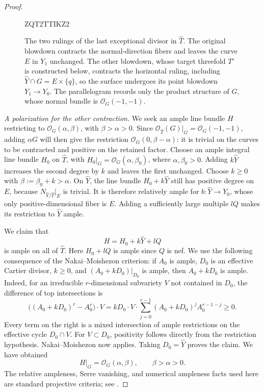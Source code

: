 \documentclass[11pt,reqno]{amsart}
\numberwithin{equation}{section}
\theoremstyle{definition}
\theoremstyle{remark}
\begin{document}
\begin{proof}
\begin{figure}[htbp]

\begingroup
{}
ZQT2TTIKZ2
\endgroup
\caption{The two rulings of the last exceptional divisor in
  $\widehat T$. The original blowdown contracts the normal-direction
  fibers and leaves the curve $E$ in $Y_1$ unchanged. The other
  blowdown, whose target threefold $T'$ is constructed below,
  contracts the horizontal ruling, including
  $\widehat Y\cap G=E\times\{q\}$, so the surface undergoes its
  point blowdown $Y_1\to Y_0$. The parallelogram records only the
  product structure of $G$, whose normal bundle is
  $\mathcal O_G(-1,-1)$.}
\label{fig:blowdown}
\end{figure}


 
 \emph{A polarization for the other contraction.}
We seek an ample line bundle $H$ restricting to
$\mathcal O_G(\alpha,\beta)$, with $\beta>\alpha>0$.
Since $\mathcal O_{\widehat T}(G)|_G=\mathcal O_G(-1,-1)$,
adding $\alpha G$ will then give the restriction
$\mathcal O_G(0,\beta-\alpha)$: it is trivial on the curves to be
contracted and positive on the retained factor.
Choose an ample integral line bundle $H_0$ on $\widehat T$, with
$H_0|_G=\mathcal O_G(\alpha,\beta_0)$, where $\alpha,\beta_0>0$.
Adding $k\widehat Y$ increases the second degree by $k$ and leaves the
first unchanged.  Choose $k\ge0$ with $\beta:=\beta_0+k>\alpha$.
On $\widehat Y$, the line bundle $H_0+k\widehat Y$ still has positive
degree on $E$, because $N_{\widehat Y/\widehat T}|_E$ is trivial.
It is therefore relatively ample for $b:\widehat Y\to Y_0$, whose
only positive-dimensional fiber is $E$.  Adding a sufficiently large
multiple $lQ$ makes its restriction to $\widehat Y$ ample.

We claim that
\[
 H=H_0+k\widehat Y+lQ
\]
is ample on all of $\widehat T$.  Here $H_0+lQ$ is ample since $Q$
is nef.  We use the following consequence of the Nakai--Moishezon
criterion: if $A_0$ is ample, $D_0$ is an effective Cartier divisor,
$k\ge0$, and $(A_0+kD_0)|_{D_0}$ is ample, then $A_0+kD_0$ is ample.
Indeed, for an irreducible $r$-dimensional subvariety $V$ not contained
in $D_0$, the difference of top intersections is
\[
 \bigl((A_0+kD_0)^r-A_0^r\bigr)\cdot V
 = kD_0\cdot V\cdot
   \sum_{j=0}^{r-1}(A_0+kD_0)^j A_0^{r-1-j}\ge0.
\]
Every term on the right is a mixed intersection of ample restrictions
on the effective cycle $D_0\cap V$.  For $V\subset D_0$, positivity
follows directly from the restriction hypothesis.  Nakai--Moishezon
now applies.  Taking $D_0=\widehat Y$ proves the claim.  We have obtained
\begin{equation}\label{proj:ample-degrees}
 H|_G=\mathcal O_G(\alpha,\beta),\qquad \beta>\alpha>0.
\end{equation}
The relative ampleness, Serre vanishing, and numerical ampleness facts
used here are standard projective criteria; see \cite{Hartshorne}.


\end{proof}
\end{document}

